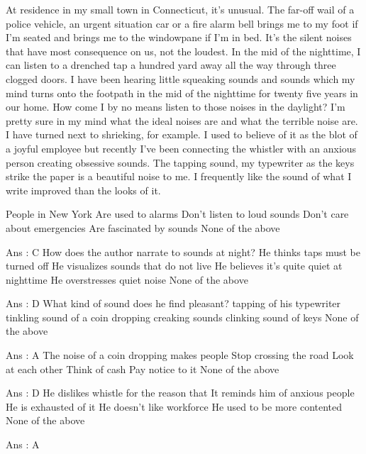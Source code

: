     At residence in my small town in Connecticut, it's unusual. The far-off wail of a police vehicle, an urgent situation car or a fire alarm bell brings me to my foot if I'm seated and brings me to the windowpane if I'm in bed. It's the silent noises that have most consequence on us, not the loudest. In the mid of the nighttime, I can listen to a drenched tap a hundred yard away all the way through three clogged doors. I have been hearing little squeaking sounds and sounds which my mind turns onto the footpath in the mid of the nighttime for twenty five years in our home. How come I by no means listen to those noises in the daylight? I'm pretty sure in my mind what the ideal noises are and what the terrible noise are.
    I have turned next to shrieking, for example. I used to believe of it as the blot of a joyful employee but recently I've been connecting the whistler with an anxious person creating obsessive sounds. The tapping sound, my typewriter as the keys strike the paper is a beautiful noise to me. I frequently like the sound of what I write improved than the looks of it.

        People in New York
            Are used to alarms
            Don’t listen to loud sounds
            Don’t care about emergencies
            Are fascinated by sounds
            None of the above 

        Ans : C
        How does the author narrate to sounds at night?
            He thinks taps must be turned off
            He visualizes sounds that do not live
            He believes it's quite quiet at nighttime
            He overstresses quiet noise
            None of the above 

        Ans : D
        What kind of sound does he find pleasant?
            tapping of his typewriter
            tinkling sound of a coin dropping
            creaking sounds
            clinking sound of keys
            None of the above 

        Ans : A
        The noise of a coin dropping makes people
            Stop crossing the road
            Look at each other
            Think of cash
            Pay notice to it
            None of the above 

        Ans : D
        He dislikes whistle for the reason that
            It reminds him of anxious people
            He is exhausted of it
            He doesn't like workforce
            He used to be more contented
            None of the above 

        Ans : A 

